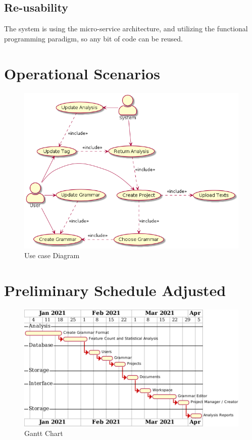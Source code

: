 \subsection {Re-usability}
The system is using the micro-service architecture, and utilizing the functional programming paradigm, so any bit of code can be reused.

\section{Operational Scenarios}
\begin{figure}[H]
    \includegraphics[width=15cm]{images/usecase.png}
    \caption{Use case Diagram}
\end{figure}

\section{Preliminary Schedule Adjusted}
\begin{figure}[H]
    \includegraphics[width=15cm]{images/gantt.png}
    \caption{Gantt Chart}
\end{figure}



